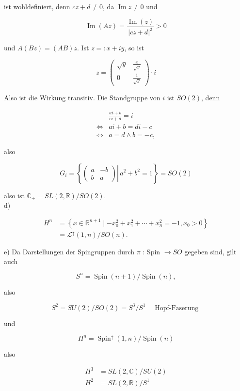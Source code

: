 \documentclass[10pt, letterpaper]{article}
\begin{document}
ist wohldefiniert, denn $c z+d \neq 0$, da $\operatorname{Im} z \neq 0$ und

$$
\operatorname{Im}(A z)=\frac{\operatorname{Im}(z)}{|c z+d|^{2}}>0
$$

und $A(B z)=(A B) z$. Ist $z=: x+i y$, so ist

$$
z=\left(\begin{array}{cc}
\sqrt{y} & \frac{x}{\sqrt{y}} \\
0 & \frac{1}{\sqrt{y}}
\end{array}\right) \cdot i
$$

Also ist die Wirkung transitiv. Die Standgruppe von $i$ ist $S O(2)$, denn

$$
\begin{aligned}
& \frac{a i+b}{c i+d}=i \\
\Leftrightarrow & a i+b=d i-c \\
\Leftrightarrow & a=d \wedge b=-c,
\end{aligned}
$$

also

$$
G_{i}=\left\{\left.\left(\begin{array}{cc}
a & -b \\
b & a
\end{array}\right) \right\rvert\, a^{2}+b^{2}=1\right\}=S O(2)
$$

also ist $\mathbb{C}_{+}=S L(2, \mathbb{R}) / S O(2)$.\\
d)

$$
\begin{aligned}
H^{n} & =\left\{x \in \mathbb{R}^{n+1} \mid-x_{0}^{2}+x_{1}^{2}+\cdots+x_{n}^{2}=-1, x_{0}>0\right\} \\
& =\mathcal{L}^{\uparrow}(1, n) / S O(n) .
\end{aligned}
$$

e) Da Darstellungen der Spingruppen durch $\pi$ : Spin $\rightarrow S O$ gegeben sind, gilt auch

$$
S^{n}=\operatorname{Spin}(n+1) / \operatorname{Spin}(n),
$$

also

$$
S^{2}=S U(2) / S O(2)=S^{3} / S^{1} \quad \text { Hopf-Faserung }
$$

und

$$
H^{n}=\operatorname{Spin}^{\uparrow}(1, n) / \operatorname{Spin}(n)
$$

also

$$
\begin{aligned}
H^{3} & =S L(2, \mathbb{C}) / S U(2) \\
H^{2} & =S L(2, \mathbb{R}) / S^{1}
\end{aligned}
$$
\end{document}

